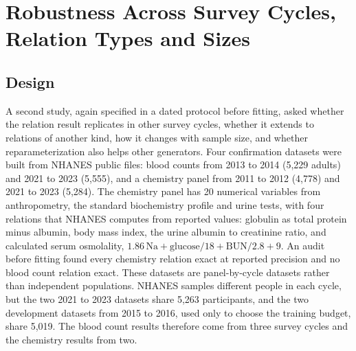 \documentclass[conference]{IEEEtran}
\begin{document}
\section{Robustness Across Survey Cycles, Relation Types and Sizes}

\subsection*{Design}

A second study, again specified in a dated protocol before fitting, asked whether the relation result replicates in other survey cycles, whether it extends to relations of another kind, how it changes with sample size, and whether reparameterization also helps other generators. Four confirmation datasets were built from NHANES public files: blood counts from 2013 to 2014 (5,229 adults) and 2021 to 2023 (5,555), and a chemistry panel from 2011 to 2012 (4,778) and 2021 to 2023 (5,284). The chemistry panel has 20 numerical variables from anthropometry, the standard biochemistry profile and urine tests, with four relations that NHANES computes from reported values: globulin as total protein minus albumin, body mass index, the urine albumin to creatinine ratio, and calculated serum osmolality, $1.86\,\mathrm{Na} + \mathrm{glucose}/18 + \mathrm{BUN}/2.8 + 9$. An audit before fitting found every chemistry relation exact at reported precision and no blood count relation exact. These datasets are panel-by-cycle datasets rather than independent populations. NHANES samples different people in each cycle, but the two 2021 to 2023 datasets share 5,263 participants, and the two development datasets from 2015 to 2016, used only to choose the training budget, share 5,019. The blood count results therefore come from three survey cycles and the chemistry results from two.
\end{document}
